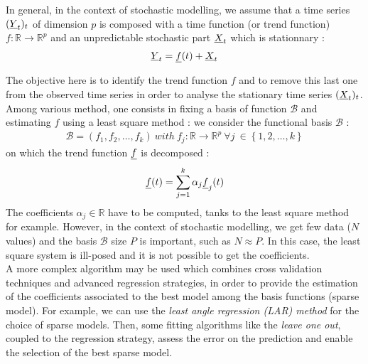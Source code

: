 \renewcommand{\filename}{docUC_StocProc_TrendComputation.tex}
\renewcommand{\filetitle}{UC : Trend computation : identification and removal}

\HeaderIIILevel

\label{TrendComputation}


In general, in the context of stochastic modelling, we assume that a time series $({\underline{Y}}_t)_t$ of dimension $p$ is composed with a time function (or trend function) $f : \mathbb{R} \longrightarrow \mathbb{R}^p$ and an unpredictable stochastic part ${\underline{X}}_t$ which is stationnary : 
\begin{eqnarray}
\label{tsDecomposition}
{\underline{Y}}_t = {\underline{f}}(t) + {\underline{X}}_t
\end{eqnarray}


The objective here is to identify the trend function $f$ and to remove this last one from the observed time series in order to analyse the stationary time series $({\underline{X}}_t)_t$. \\
Among various method, one consists in fixing a basis of function $\mathcal{B}$ and estimating $f$ using a least square method : we consider the functional basis $\mathcal{B}$ :
\begin{eqnarray*}
\mathcal{B} = (f_1, f_2, \ldots, f_k)\ with \ f_j : \mathbb{R} \longrightarrow \mathbb{R}^p \ \forall j \ \in \left\{1,2,\ldots,k\right\}
\end{eqnarray*}
on which the trend function ${\underline{f}}$ is decomposed :
\begin{eqnarray*}
{\underline{f}}(t) = \sum_{j=1}^{k} \alpha_j {\underline{f}}_j(t)
\end{eqnarray*}
The coefficients $\alpha_j \in \mathbb{R}$ have to be computed, tanks to the  least square method for example. However, in the context of stochastic modelling, we get few data ($N$ values) and the basis $\mathcal{B}$ size $P$ is important, such as $N \approx P$. In this case, the least square system is ill-posed and it is not possible to get the coefficients.\\
A more complex algorithm may be used which combines cross validation techniques and advanced regression strategies, in order to provide the estimation of the  coefficients associated to the best model among the  basis functions (sparse model). For example, we can use the \emph{least angle regression (LAR)  method} for the choice of sparse models.  Then, some fitting algorithms like the \emph{leave one out}, coupled to the regression strategy, assess the error on the prediction and enable the selection of the best sparse model.\\

